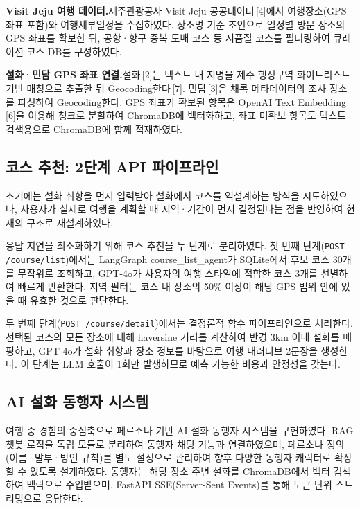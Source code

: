 \documentclass[10pt,twocolumn,a4paper]{article}
\begin{document}
\textbf{Visit Jeju 여행 데이터.}\quad 제주관광공사 Visit Jeju 공공데이터\,[4]에서
여행장소(GPS 좌표 포함)와 여행세부일정을 수집하였다. 장소명 기준 조인으로
일정별 방문 장소의 GPS 좌표를 확보한 뒤, 공항·항구 중복 도배 코스 등
저품질 코스를 필터링하여 큐레이션 코스 DB를 구성하였다.

\textbf{설화·민담 GPS 좌표 연결.}\quad 설화\,[2]는 텍스트 내 지명을 제주
행정구역 화이트리스트 기반 매칭으로 추출한 뒤 Geocoding한다\,[7].
민담\,[3]은 채록 메타데이터의 조사 장소를 파싱하여 Geocoding한다.
GPS 좌표가 확보된 항목은 OpenAI Text Embedding\,[6]을 이용해 청크로
분할하여 ChromaDB에 벡터화하고, 좌표 미확보 항목도 텍스트 검색용으로
ChromaDB에 함께 적재하였다.

\subsection{코스 추천: 2단계 API 파이프라인}

초기에는 설화 취향을 먼저 입력받아 설화에서 코스를 역설계하는 방식을
시도하였으나, 사용자가 실제로 여행을 계획할 때 지역·기간이 먼저 결정된다는
점을 반영하여 현재의 구조로 재설계하였다.

응답 지연을 최소화하기 위해 코스 추천을 두 단계로 분리하였다. 첫 번째
단계(\texttt{POST /course/list})에서는 LangGraph course\_list\_agent가 SQLite에서
후보 코스 30개를 무작위로 조회하고, GPT-4o가 사용자의 여행 스타일에 적합한 코스
3개를 선별하여 빠르게 반환한다. 지역 필터는 코스 내 장소의 50\% 이상이 해당
GPS 범위 안에 있을 때 유효한 것으로 판단한다.

두 번째 단계(\texttt{POST /course/detail})에서는 결정론적 함수 파이프라인으로
처리한다. 선택된 코스의 모든 장소에 대해 haversine 거리를 계산하여 반경
3km 이내 설화를 매핑하고, GPT-4o가 설화 취향과 장소 정보를 바탕으로 여행
내러티브 2문장을 생성한다. 이 단계는 LLM 호출이 1회만 발생하므로 예측
가능한 비용과 안정성을 갖는다.

\subsection{AI 설화 동행자 시스템}

여행 중 경험의 중심축으로 페르소나 기반 AI 설화 동행자 시스템을 구현하였다.
RAG 챗봇 로직을 독립 모듈로 분리하여 동행자 채팅 기능과 연결하였으며,
페르소나 정의(이름·말투·방언 규칙)를 별도 설정으로 관리하여 향후 다양한
동행자 캐릭터로 확장할 수 있도록 설계하였다. 동행자는 해당 장소 주변 설화를
ChromaDB에서 벡터 검색하여 맥락으로 주입받으며, FastAPI
SSE(Server-Sent Events)를 통해 토큰 단위 스트리밍으로 응답한다.
\end{document}
